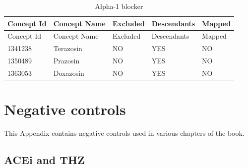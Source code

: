 \documentclass[10.5pt]{book}
\theoremstyle{definition}
\theoremstyle{definition}
\theoremstyle{definition}
\theoremstyle{remark}
\begin{document}
\begin{longtable}[]{@{}lllll@{}}
\caption{\label{tab:A1BUseA1Bs} Alpha-1 blocker}\tabularnewline
\toprule
Concept Id & Concept Name & Excluded & Descendants &
Mapped\tabularnewline
\midrule
\endfirsthead
\toprule
Concept Id & Concept Name & Excluded & Descendants &
Mapped\tabularnewline
\midrule
\endhead
1341238 & Terazosin & NO & YES & NO\tabularnewline
1350489 & Prazosin & NO & YES & NO\tabularnewline
1363053 & Doxazosin & NO & YES & NO\tabularnewline
\bottomrule
\end{longtable}

\chapter{Negative controls}\label{NegativeControlsAppendix}

This Appendix contains negative controls used in various chapters of the
book.

\section{ACEi and THZ}\label{AceiThzNsc}
\end{document}
